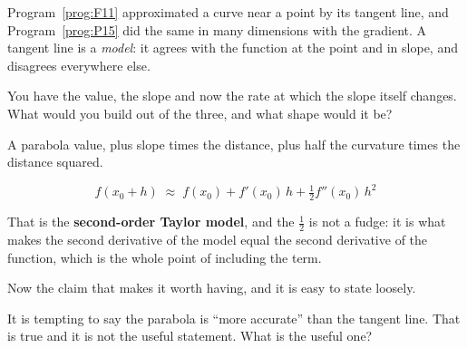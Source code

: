 \begin{fr}
Program~\ref{prog:F11} approximated a curve near a point by its tangent line,
and Program~\ref{prog:P15} did the same in many dimensions with the gradient.
A tangent line is a \emph{model}: it agrees with the function at the point and
in slope, and disagrees everywhere else.

You have the value, the slope and now the rate at which the slope itself
changes. What would you build out of the three, and what shape would it be?
\dotline
\nextframe
\end{fr}

\begin{fr}
\begin{ansblock}
A parabola \dash{} value, plus slope times the distance, plus half the
curvature times the distance squared.
\end{ansblock}

\[ f(x_0 + h) \;\approx\; f(x_0) + f'(x_0)\,h + \tfrac{1}{2}f''(x_0)\,h^{2} \]

That is the \textbf{second-order Taylor model}, and the $\tfrac{1}{2}$ is not
a fudge: it is what makes the second derivative of the model equal the second
derivative of the function, which is the whole point of including the term.

\end{fr}

\begin{fr}
Now the claim that makes it worth having, and it is easy to state loosely.

It is tempting to say the parabola is \enquote{more accurate} than the tangent
line. That is true and it is not the useful statement. What is the useful one?
\nextframe
\end{fr}

